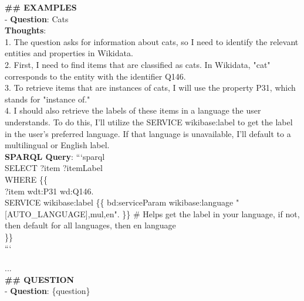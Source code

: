 {\begin{tcolorbox}[title=SPARQL Query Generation Prompt, colback=blue!5!white, colframe=blue!75!black, boxrule=0.5mm, arc=2mm, fontupper=\ttfamily, verbatim, breakable, before upper=\vspace{2mm}]
\textbf{\#\# EXAMPLES} \\
- \textbf{Question}: Cats\\
\textbf{Thoughts}:\\
1. The question asks for information about cats, so I need to identify the relevant entities and properties in Wikidata.\\
2. First, I need to find items that are classified as cats. In Wikidata, "cat" corresponds to the entity with the identifier Q146.\\
3. To retrieve items that are instances of cats, I will use the property P31, which stands for "instance of."\\
4. I should also retrieve the labels of these items in a language the user understands. To do this, I'll utilize the SERVICE wikibase:label to get the label in the user's preferred language. If that language is unavailable, I'll default to a multilingual or English label.\\
\textbf{SPARQL Query}: ```sparql\\
SELECT ?item ?itemLabel\\
WHERE \{\{ \\
?item wdt:P31 wd:Q146.\\
SERVICE wikibase:label \{\{ bd:serviceParam wikibase:language "[AUTO\_LANGUAGE],mul,en". \}\} \# Helps get the label in your language, if not, then default for all languages, then en language\\
\}\}\\
```

...\\

\textbf{\#\# QUESTION} \\
- \textbf{Question}: \{question\}
    \end{tcolorbox}
}

